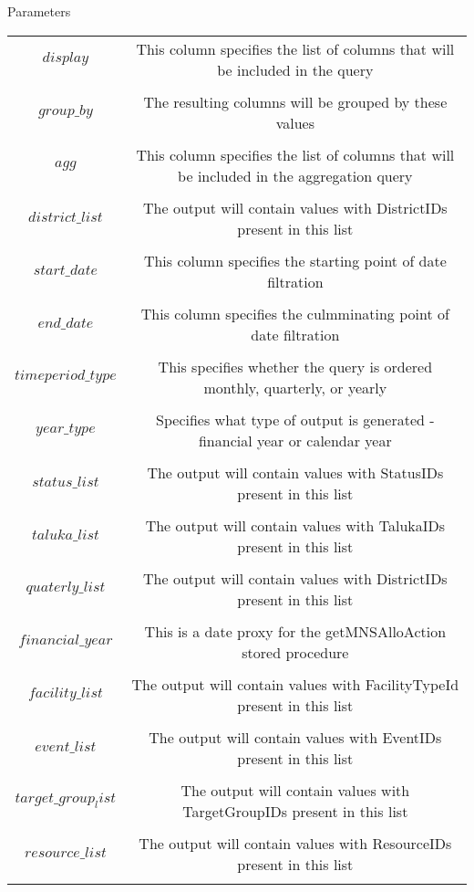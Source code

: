 \documentclass[
10pt, %
a4paper, %
oneside, %
headinclude,footinclude, %
BCOR5mm, %
]{scrartcl}
\begin{document}
\begin{section}{Parameters}

\begin{center}
\begin{tabular}{| c | c |}
\hline 
$display$ & This column specifies the list of columns that will be included in the query \\ \\ 
\hline 
 $group\_by$ & The resulting columns will be grouped by these values \\ \\
\hline 
$agg$ &  This column specifies the list of columns that will be included in the aggregation query \\ \\ 
\hline 
 $district\_list$ &  The output will contain values with DistrictIDs present in this list\\ \\ 
\hline 
$start\_date$ & This column specifies the starting point of date filtration \\ \\
\hline 
$end\_date$ & This column specifies the culmminating point of date filtration  \\ \\
\hline 
$timeperiod\_type$  & This specifies whether the query is ordered monthly, quarterly, or yearly  \\ \\ 
\hline 
$year\_type$  & Specifies what type of output is generated - financial year or calendar year \\ \\ 
\hline 
$status\_list$  & The output will contain values with StatusIDs present in this list \\ \\ 
\hline 
$taluka\_list$ & The output will contain values with TalukaIDs present in this list \\ \\ 
\hline 
$quaterly\_list$ & The output will contain values with DistrictIDs present in this list \\ \\ 
\hline 
 $financial\_year$ & This is a date proxy for the getMNSAlloAction stored procedure  \\ \\ 
\hline 
$facility\_list$ &  The output will contain values with FacilityTypeId present in this list\\ \\ 
\hline 
 $event\_list$ & The output will contain values with EventIDs present in this list   \\ \\ 
\hline 
$target\_group_list$ & The output will contain values with TargetGroupIDs present in this list \\ \\ 
\hline 
$resource\_list$ & The output will contain values with ResourceIDs present in this list  \\ \\ 
\hline 
\end{tabular} 
\end{center}

\end{section}
\end{document}
